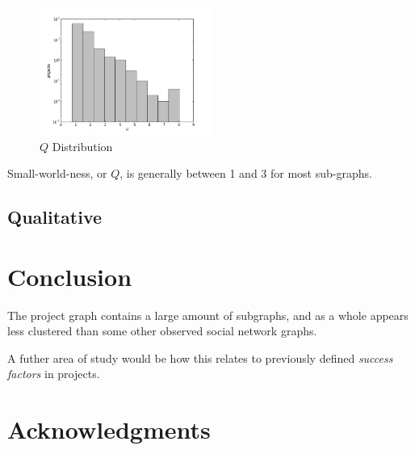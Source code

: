 \documentclass{proc}
\begin{document}
\begin{figure}
\begin{center}
\includegraphics[width=0.5\textwidth]{images/sf-q-histo.png}
\end{center}
\caption{$Q$ Distribution}
\label{fig:q_sf_distribution}
\end{figure}

Small-world-ness, or $Q$, is generally between 1 and 3 for most sub-graphs.


\subsection{Qualitative}

\section{Conclusion}
The project graph contains a large amount of subgraphs, and as a whole appears less clustered than some other observed social network graphs\cite{madey2002open}.

A futher area of study would be how this relates to previously defined \textit{success factors} in projects\cite{cooke2002real}.


\section{Acknowledgments}






\end{document}
